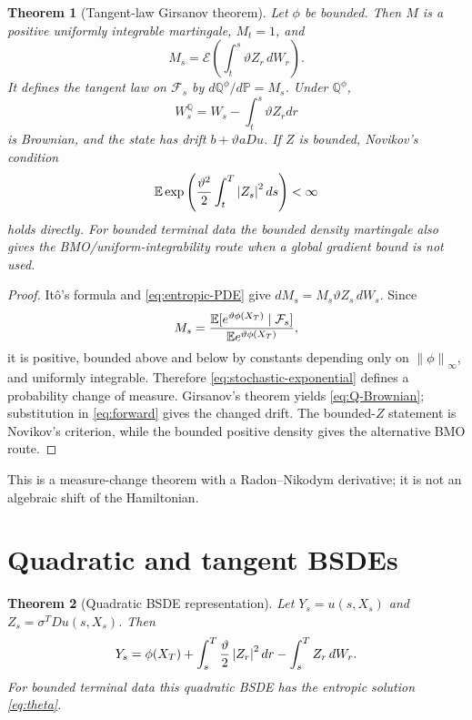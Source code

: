 \documentclass[11pt,reqno]{amsart}
\newtheorem{theorem}{Theorem}[section]
\theoremstyle{definition}
\theoremstyle{remark}
\newcommand{\E}{\mathbb E}
\newcommand{\F}{\mathcal F}
\newcommand{\Pp}{\mathbb P}
\newcommand{\Qp}{\mathbb Q}
\newcommand{\norm}[1]{\left\lVert #1\right\rVert}
\newcommand{\abs}[1]{\left\lvert #1\right\rvert}
\begin{document}
\begin{theorem}[Tangent-law Girsanov theorem]\label{thm:Girsanov}
Let $\phi$ be bounded.  Then $M$ is a positive uniformly integrable martingale,
$M_t=1$, and
\begin{equation}\label{eq:stochastic-exponential}
 M_s=\mathcal E\left(
 \int_t^s\vartheta Z_r\,dW_r\right).
\end{equation}
It defines the tangent law on $\F_s$ by
$d\Qp^\phi/d\Pp=M_s$.  Under $\Qp^\phi$,
\begin{equation}\label{eq:Q-Brownian}
 W_s^{\Qp}=W_s-\int_t^s\vartheta Z_rdr
\end{equation}
is Brownian, and the state has drift
$b+\vartheta aDu$.  If $Z$ is bounded, Novikov's condition
\[
 \E\exp\left({\vartheta^2\over2}\int_t^T\abs{Z_s}^2ds\right)<\infty
\]
holds directly.  For bounded terminal data the bounded density martingale also
gives the BMO/uniform-integrability route when a global gradient bound is not
used.
\end{theorem}

\begin{proof}
It\^o's formula and \eqref{eq:entropic-PDE} give
$dM_s=M_s\vartheta Z_s\,dW_s$.  Since
\[
 M_s={\E[e^{\vartheta\phi(X_T)}\mid\F_s]
 \over\E e^{\vartheta\phi(X_T)}},
\]
it is positive, bounded above and below by constants depending only on
$\norm\phi_\infty$, and uniformly integrable.  Therefore
\eqref{eq:stochastic-exponential} defines a probability change of measure.
Girsanov's theorem yields \eqref{eq:Q-Brownian}; substitution in
\eqref{eq:forward} gives the changed drift.  The bounded-$Z$ statement is
Novikov's criterion, while the bounded positive density gives the alternative
BMO route.
\end{proof}

This is a measure-change theorem with a Radon--Nikodym derivative; it is not an
algebraic shift of the Hamiltonian.

\section{Quadratic and tangent BSDEs}

\begin{theorem}[Quadratic BSDE representation]\label{thm:BSDE}
Let $Y_s=u(s,X_s)$ and $Z_s=\sigma^TDu(s,X_s)$.  Then
\begin{equation}\label{eq:BSDE}
 Y_s=\phi(X_T)+
 \int_s^T{\vartheta\over2}\abs{Z_r}^2dr
 -\int_s^TZ_r\,dW_r.
\end{equation}
For bounded terminal data this quadratic BSDE has the entropic solution
\eqref{eq:theta}.
\end{theorem}
\end{document}
